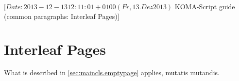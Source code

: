 %
%
%
%
%
%
%
%
% 
%
%
%
%

%
                 [$Date: 2013-12-13 12:11:01 +0100 (Fr, 13. Dez 2013) $
                  KOMA-Script guide (common paragraphs: Interleaf Pages)]


\makeatletter
{}%
%
%
%
\makeatother


\section{Interleaf Pages}
\label{sec:\csname label@base\endcsname.emptypage}%
\ifshortversion\IgnoreThisfalse{}\fi%
\ifIgnoreThis %
 What is described in
\autoref{sec:maincls.emptypage} applies, mutatis mutandis.
\else %
%

